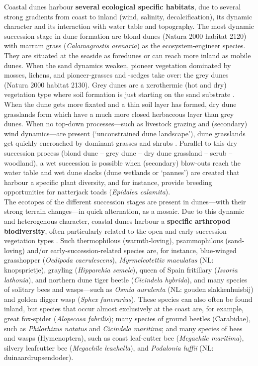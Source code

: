 \documentclass[10pt, twoside]{book} %
\begin{document}
	Coastal dunes harbour \textbf{several ecological specific habitats}, due to several strong gradients from coast to inland (wind, salinity, decalcification), its dynamic character and its interaction with water table and topography. The most dynamic succession stage in dune formation are blond dunes (Natura 2000 habitat 2120) with marram grass (\textit{Calamagrostis arenaria}) as the ecosystem-engineer species. They are situated at the seaside as foredunes or can reach more inland as mobile dunes. When the sand dynamics weaken, pioneer vegetation dominated by mosses, lichens, and pioneer-grasses and -sedges take over: the grey dunes (Natura 2000 habitat 2130). Grey dunes are a xerothermic (hot and dry) vegetation type where soil formation is just starting on the sand substrate \citep{provoost2004}. When the dune gets more fixated and a thin soil layer has formed, dry dune grasslands form which have a much more closed herbaceous layer than grey dunes. When no top-down processes---such as livestock grazing and (secondary) wind dynamics---are present (`unconstrained dune landscape'), dune grasslands get quickly encroached by dominant grasses and shrubs \citep{provoost2004a}. Parallel to this dry succession process (blond dune -- grey dune -- dry dune grassland -- scrub -- woodland), a wet succession is possible when (secondary) blow-outs reach the water table and wet dune slacks (dune wetlands or `pannes') are created that harbour a specific plant diversity, and for instance, provide breeding opportunities for natterjack toads (\textit{Epidalea calamita}).\\
	
	The ecotopes of the different succession stages are present in dunes---with their strong terrain changes---in quick alternation, as a mosaic. Due to this dynamic and heterogenous character, coastal dunes harbour a \textbf{specific arthropod biodiversity}, often particularly related to the open and early-succession vegetation types \citep{maes2006, provoost2011}. Such thermophilous (warmth-loving), psammophilous (sand-loving) and/or early-succession-related species are, for instance, blue-winged grasshopper (\textit{Oedipoda caerulescens}), \textit{Myrmeleotettix maculatus} (NL: knopsprietje), grayling (\textit{Hipparchia semele}), queen of Spain fritillary (\textit{Issoria lathonia}), and northern dune tiger beetle (\textit{Cicindela hybrida}), and many species of solitary bees and wasps---such as \textit{Osmia aurulenta} (NL: gouden slakkenhuisbij) and golden digger wasp (\textit{Sphex funerarius}). These species can also often be found inland, but species that occur almost exclusively at the coast are, for example, great fox-spider (\textit{Alopecosa fabrilis}); many species of ground beetles (Carabidae), such as \textit{Philorhizus notatus} and \textit{Cicindela maritima}; and many species of bees and wasps (Hymenoptera), such as coast leaf-cutter bee (\textit{Megachile maritima}), silvery leafcutter bee (\textit{Megachile leachella}), and \textit{Podalonia luffii} (NL: duinaardrupsendoder).\\
	
\end{document}
